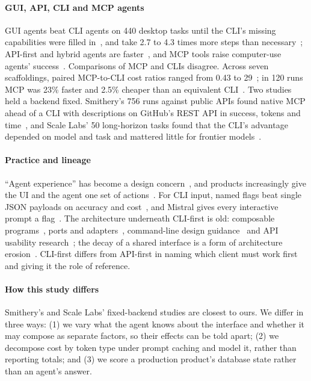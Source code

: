 \documentclass[sigconf,nonacm]{acmart}
\begin{document}
\paragraph{GUI, API, CLI and MCP agents}
GUI agents beat CLI agents on 440 desktop tasks until the CLI's missing capabilities were filled in~\cite{zhou2026guicli}, and take 2.7 to 4.3 times more steps than necessary~\cite{abhyankar2025osworldhuman}; API-first and hybrid agents are faster~\cite{lu2024axis,zhang2025apigui,zhang2025ufo2}, and MCP tools raise computer-use agents' success~\cite{jia2025osworldmcp}. Comparisons of MCP and CLIs disagree. Across seven scaffoldings, paired MCP-to-CLI cost ratios ranged from 0.43 to 29~\cite{alier2026scaffolding}; in 120 runs MCP was 23\% faster and 2.5\% cheaper than an equivalent CLI~\cite{zechner2025mcpcli}. Two studies held a backend fixed. Smithery's 756 runs against public APIs found native MCP ahead of a CLI with descriptions on GitHub's REST API in success, tokens and time~\cite{mao2026smithery,nordicapis2026mcpcli}, and Scale Labs' 50 long-horizon tasks found that the CLI's advantage depended on model and task and mattered little for frontier models~\cite{hou2026scale}.

\paragraph{Practice and lineage}
``Agent experience'' has become a design concern~\cite{biilmann2025ax,baer2026agentsfirst}, and products increasingly give the UI and the agent one set of actions~\cite{builderio2026app,posthog2026golden}. For CLI input, named flags beat single JSON payloads on accuracy and cost~\cite{mastykarz2026dont,poehnelt2026rewrite}, and Mistral gives every interactive prompt a flag~\cite{mistral2026spaces}. The architecture underneath CLI-first is old: composable programs~\cite{mcilroy1978unix}, ports and adapters~\cite{cockburn2005hexagonal}, command-line design guidance~\cite{clig2020} and API usability research~\cite{myers2016api}; the decay of a shared interface is a form of architecture erosion~\cite{perry1992foundations,desilva2012erosion}. CLI-first differs from API-first in naming which client must work first and giving it the role of reference.

\paragraph{How this study differs}
Smithery's and Scale Labs' fixed-backend studies are closest to ours. We differ in three ways: (1) we vary what the agent knows about the interface and whether it may compose as separate factors, so their effects can be told apart; (2) we decompose cost by token type under prompt caching and model it, rather than reporting totals; and (3) we score a production product's database state rather than an agent's answer.
\end{document}
